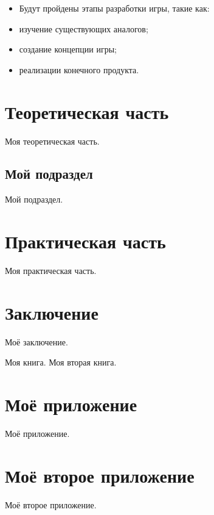 \documentclass{../mirea-prog-lang}
\begin{document}
\begin{itemize}
	\item[] Будут пройдены этапы разработки игры, такие как:
	\item изучение существующих аналогов;
	\item создание концепции игры;
	\item реализации конечного продукта.
\end{itemize}

\section{Теоретическая часть}

Моя теоретическая часть.

\subsection{Мой подраздел}

Мой подраздел.



\section{Практическая часть}

Моя практическая часть.



\section*{Заключение}
{}

Моё заключение.



\begin{thebibliography}{99\kern\bibindent}
	 Моя книга.
	 Моя вторая книга. 
\end{thebibliography}



\appendix

\section{Моё приложение}

Моё приложение.

\section{Моё второе приложение}

Моё второе приложение.


	
\end{document}

